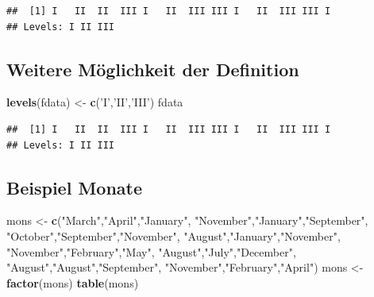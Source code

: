 \documentclass[]{article}
\newenvironment{Shaded}{\begin{snugshade}}{\end{snugshade}}
\newcommand{\KeywordTok}[1]{\textcolor[rgb]{0.13,0.29,0.53}{\textbf{{#1}}}}
\newcommand{\StringTok}[1]{\textcolor[rgb]{0.31,0.60,0.02}{{#1}}}
\newcommand{\NormalTok}[1]{{#1}}
\begin{document}
\begin{verbatim}
##  [1] I   II  II  III I   II  III III I   II  III III I  
## Levels: I II III
\end{verbatim}

\subsection{Weitere Möglichkeit der
Definition}\label{weitere-moglichkeit-der-definition}

\begin{Shaded}
\begin{Highlighting}[]
\KeywordTok{levels}\NormalTok{(fdata) <-}\StringTok{ }\KeywordTok{c}\NormalTok{(}\StringTok{'I'}\NormalTok{,}\StringTok{'II'}\NormalTok{,}\StringTok{'III'}\NormalTok{)}
\NormalTok{fdata}
\end{Highlighting}
\end{Shaded}

\begin{verbatim}
##  [1] I   II  II  III I   II  III III I   II  III III I  
## Levels: I II III
\end{verbatim}

\subsection{Beispiel Monate}\label{beispiel-monate}

\begin{Shaded}
\begin{Highlighting}[]
\NormalTok{mons <-}\StringTok{ }\KeywordTok{c}\NormalTok{(}\StringTok{"March"}\NormalTok{,}\StringTok{"April"}\NormalTok{,}\StringTok{"January"}\NormalTok{,}
          \StringTok{"November"}\NormalTok{,}\StringTok{"January"}\NormalTok{,}\StringTok{"September"}\NormalTok{,}
          \StringTok{"October"}\NormalTok{,}\StringTok{"September"}\NormalTok{,}\StringTok{"November"}\NormalTok{,}
          \StringTok{"August"}\NormalTok{,}\StringTok{"January"}\NormalTok{,}\StringTok{"November"}\NormalTok{,}
          \StringTok{"November"}\NormalTok{,}\StringTok{"February"}\NormalTok{,}\StringTok{"May"}\NormalTok{,}
          \StringTok{"August"}\NormalTok{,}\StringTok{"July"}\NormalTok{,}\StringTok{"December"}\NormalTok{,}
          \StringTok{"August"}\NormalTok{,}\StringTok{"August"}\NormalTok{,}\StringTok{"September"}\NormalTok{,}
          \StringTok{"November"}\NormalTok{,}\StringTok{"February"}\NormalTok{,}\StringTok{"April"}\NormalTok{)}
\NormalTok{mons <-}\StringTok{ }\KeywordTok{factor}\NormalTok{(mons)}
\KeywordTok{table}\NormalTok{(mons)}
\end{Highlighting}
\end{Shaded}
\end{document}
